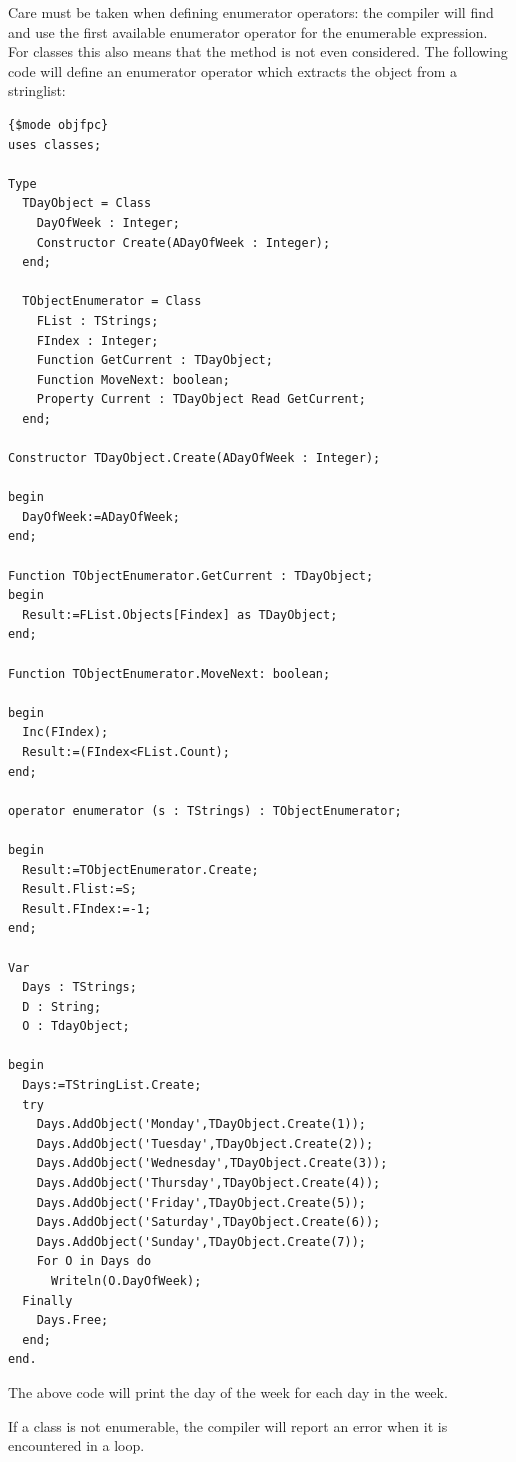 Care must be taken when defining enumerator operators: the compiler will
find and use the first available enumerator operator for the enumerable
expression. For classes this also means that the  method
is not even considered. The following code will define an enumerator
operator which extracts the object from a stringlist:
\begin{verbatim}
{$mode objfpc}
uses classes;

Type
  TDayObject = Class
    DayOfWeek : Integer;
    Constructor Create(ADayOfWeek : Integer);
  end;

  TObjectEnumerator = Class
    FList : TStrings;
    FIndex : Integer;
    Function GetCurrent : TDayObject;
    Function MoveNext: boolean;
    Property Current : TDayObject Read GetCurrent;
  end;

Constructor TDayObject.Create(ADayOfWeek : Integer);

begin
  DayOfWeek:=ADayOfWeek;
end;

Function TObjectEnumerator.GetCurrent : TDayObject;
begin
  Result:=FList.Objects[Findex] as TDayObject;
end;

Function TObjectEnumerator.MoveNext: boolean;

begin
  Inc(FIndex);
  Result:=(FIndex<FList.Count);
end;

operator enumerator (s : TStrings) : TObjectEnumerator;

begin
  Result:=TObjectEnumerator.Create;
  Result.Flist:=S;
  Result.FIndex:=-1;
end;

Var
  Days : TStrings;
  D : String;
  O : TdayObject;

begin
  Days:=TStringList.Create;
  try
    Days.AddObject('Monday',TDayObject.Create(1));
    Days.AddObject('Tuesday',TDayObject.Create(2));
    Days.AddObject('Wednesday',TDayObject.Create(3));
    Days.AddObject('Thursday',TDayObject.Create(4));
    Days.AddObject('Friday',TDayObject.Create(5));
    Days.AddObject('Saturday',TDayObject.Create(6));
    Days.AddObject('Sunday',TDayObject.Create(7));
    For O in Days do
      Writeln(O.DayOfWeek);
  Finally
    Days.Free;
  end;
end.
\end{verbatim}
The above code will print the day of the week for each day in the week.

If a class is not enumerable, the compiler will report an error when it is
encountered in a  loop.

